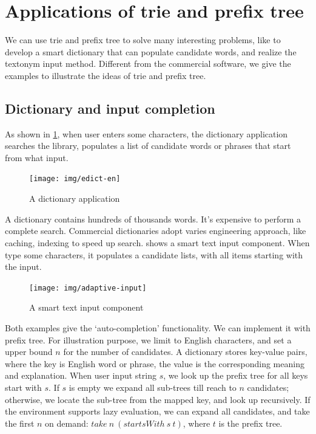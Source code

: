 \documentclass[b5paper]{article}
\begin{document}
\section{Applications of trie and prefix tree}
We can use trie and prefix tree to solve many interesting problems, like to develop a smart dictionary that can populate candidate words, and realize the textonym input method. Different from the commercial software, we give the examples to illustrate the ideas of trie and prefix tree.

\subsection{Dictionary and input completion}
As shown in \cref{fig:e-dict}, when user enters some characters, the dictionary application searches the library, populates a list of candidate words or phrases that start from what input.

\begin{figure}[htbp]
  \centering
  \texttt{[image: img/edict-en]}
  \caption{A dictionary application}
  \label{fig:e-dict}
\end{figure}

A dictionary contains hundreds of thousands words. It's expensive to perform a complete search. Commercial dictionaries adopt varies engineering approach, like caching, indexing to speed up search.  shows a smart text input component. When type some characters, it populates a candidate lists, with all items starting with the input.

\begin{figure}[htbp]
  \centering
  \texttt{[image: img/adaptive-input]}
  \caption{A smart text input component}
  \label{fig:word-completion}
\end{figure}

Both examples give the `auto-completion' functionality. We can implement it with prefix tree. For illustration purpose, we limit to English characters, and set a upper bound $n$ for the number of candidates. A dictionary stores key-value pairs, where the key is English word or phrase, the value is the corresponding meaning and explanation. When user input string $s$, we look up the prefix tree for all keys start with $s$. If $s$ is empty we expand all sub-trees till reach to $n$ candidates; otherwise, we locate the sub-tree from the mapped key, and look up recursively. If the environment supports lazy evaluation, we can expand all candidates, and take the first $n$ on demand: $take\ n\ (startsWith\ s\ t)$, where $t$ is the prefix tree.
\end{document}

